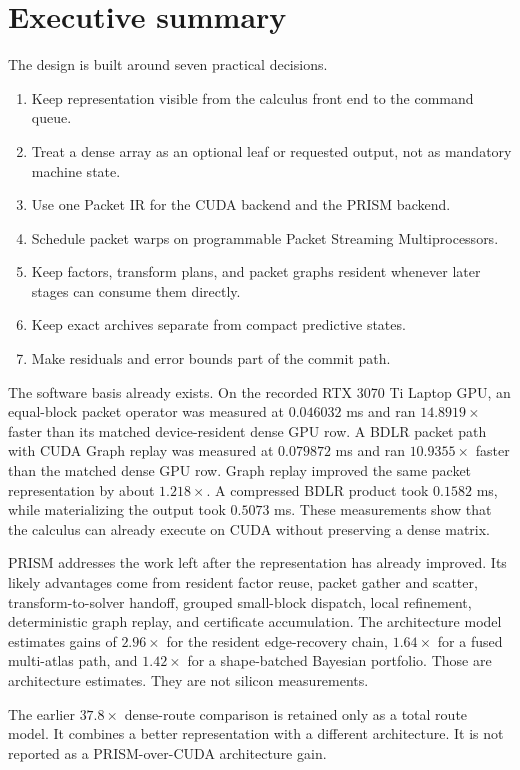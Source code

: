 \documentclass[11pt,oneside,openany]{book}
\theoremstyle{remark}
\begin{document}
\clearpage
\chapter*{Executive summary}
The design is built around seven practical decisions.
\begin{enumerate}
\item Keep representation visible from the calculus front end to the command queue.
\item Treat a dense array as an optional leaf or requested output, not as mandatory machine state.
\item Use one Packet IR for the CUDA backend and the PRISM backend.
\item Schedule packet warps on programmable Packet Streaming Multiprocessors.
\item Keep factors, transform plans, and packet graphs resident whenever later stages can consume them directly.
\item Keep exact archives separate from compact predictive states.
\item Make residuals and error bounds part of the commit path.
\end{enumerate}

The software basis already exists. On the recorded RTX 3070 Ti Laptop GPU, an equal-block packet operator was measured at $0.046032$ ms and ran $14.8919\times$ faster than its matched device-resident dense GPU row. A BDLR packet path with CUDA Graph replay was measured at $0.079872$ ms and ran $10.9355\times$ faster than the matched dense GPU row. Graph replay improved the same packet representation by about $1.218\times$. A compressed BDLR product took $0.1582$ ms, while materializing the output took $0.5073$ ms. These measurements show that the calculus can already execute on CUDA without preserving a dense matrix.

PRISM addresses the work left after the representation has already improved. Its likely advantages come from resident factor reuse, packet gather and scatter, transform-to-solver handoff, grouped small-block dispatch, local refinement, deterministic graph replay, and certificate accumulation. The architecture model estimates gains of $2.96\times$ for the resident edge-recovery chain, $1.64\times$ for a fused multi-atlas path, and $1.42\times$ for a shape-batched Bayesian portfolio. Those are architecture estimates. They are not silicon measurements.

The earlier $37.8\times$ dense-route comparison is retained only as a total route model. It combines a better representation with a different architecture. It is not reported as a PRISM-over-CUDA architecture gain.
\end{document}
